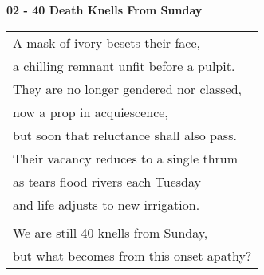 \documentclass{article}
\begin{document}
\begin{center}
\textbf{02 - 40 Death Knells From Sunday} \\
\vspace*{2ex}
\begin{tabular}{l}
A mask of ivory besets their face, \\
a chilling remnant unfit before a pulpit. \\
They are no longer gendered nor classed, \\
now a prop in acquiescence, \\
but soon that reluctance shall also pass. \\
Their vacancy reduces to a single thrum \\
as tears flood rivers each Tuesday \\ %
and life adjusts to new irrigation. \\
\\
We are still 40 knells from Sunday, \\
but what becomes from this onset apathy? \\
\end{tabular}
\end{center}
\end{document}
